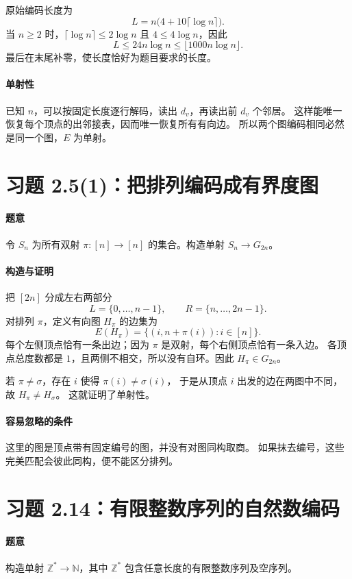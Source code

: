 \documentclass[UTF8,fontset=fandol,11pt,a4paper]{ctexart}
\begin{document}
原始编码长度为
\[
 L=n\bigl(4+10\lceil\log n\rceil\bigr).
\]
当 $n\ge2$ 时，$\lceil\log n\rceil\le2\log n$ 且 $4\le4\log n$，因此
\[
 L\le24n\log n\le\lfloor1000n\log n\rfloor.
\]
最后在末尾补零，使长度恰好为题目要求的长度。

\paragraph{单射性}
已知 $n$，可以按固定长度逐行解码，读出 $d_v$，再读出前 $d_v$ 个邻居。
这样能唯一恢复每个顶点的出邻接表，因而唯一恢复所有有向边。
所以两个图编码相同必然是同一个图，$E$ 为单射。

\section{习题 2.5(1)：把排列编码成有界度图}

\paragraph{题意}
令 $S_n$ 为所有双射 $\pi:[n]\to[n]$ 的集合。构造单射 $S_n\to G_{2n}$。

\paragraph{构造与证明}
把 $[2n]$ 分成左右两部分
\[
 L=\{0,\ldots,n-1\},\qquad R=\{n,\ldots,2n-1\}.
\]
对排列 $\pi$，定义有向图 $H_\pi$ 的边集为
\[
 E(H_\pi)=\bigl\{(i,n+\pi(i)):i\in[n]\bigr\}.
\]
每个左侧顶点恰有一条出边；因为 $\pi$ 是双射，每个右侧顶点恰有一条入边。
各顶点总度数都是 $1$，且两侧不相交，所以没有自环。因此 $H_\pi\in G_{2n}$。

若 $\pi\ne\sigma$，存在 $i$ 使得 $\pi(i)\ne\sigma(i)$，
于是从顶点 $i$ 出发的边在两图中不同，故 $H_\pi\ne H_\sigma$。
这就证明了单射性。

\paragraph{容易忽略的条件}
这里的图是顶点带有固定编号的图，并没有对图同构取商。
如果抹去编号，这些完美匹配会彼此同构，便不能区分排列。

\section{习题 2.14：有限整数序列的自然数编码}

\paragraph{题意}
构造单射 $\mathbb Z^*\to\mathbb N$，其中 $\mathbb Z^*$ 包含任意长度的有限整数序列及空序列。
\end{document}
